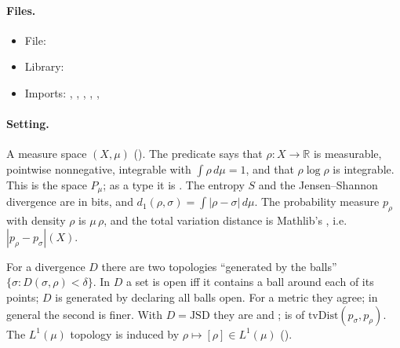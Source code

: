 \documentclass[11pt]{article}
\begin{document}
\paragraph{Files.}\leavevmode
\begin{itemize}
\item File: 
\item Library: 
\item Imports: ,\newline
  ,\newline
  ,\newline
  ,\newline
  ,\newline
\end{itemize}

\paragraph{Setting.} A measure space $(X, \mu)$ (). The predicate
 says that $\rho \colon X \to \mathbb{R}$ is measurable, pointwise
nonnegative, integrable with $\int \rho\, d\mu = 1$, and that $\rho \log \rho$ is integrable.
This is the space $P_\mu$; as a type it is . The entropy $S$ and the
Jensen--Shannon divergence are in bits, and $d_1(\rho, \sigma) = \int |\rho - \sigma|\, d\mu$.
The probability measure $p_\rho$ with density $\rho$ is  $\mu\,\rho$, and the total
variation distance is Mathlib's , i.e.\ $|p_\rho - p_\sigma|(X)$.

For a divergence $D$ there are two topologies ``generated by the balls''
$\{\sigma : D(\sigma, \rho) < \delta\}$. In  $D$ a set is open iff it contains
a ball around each of its points;  $D$ is generated by declaring all balls
open. For a metric they agree; in general the second is finer. With $D = \mathrm{JSD}$ they are
 and ;  is  of
$\mathrm{tvDist}(p_\sigma, p_\rho)$. The $L^1(\mu)$ topology  is induced by
$\rho \mapsto [\rho] \in L^1(\mu)$ ().
\end{document}
